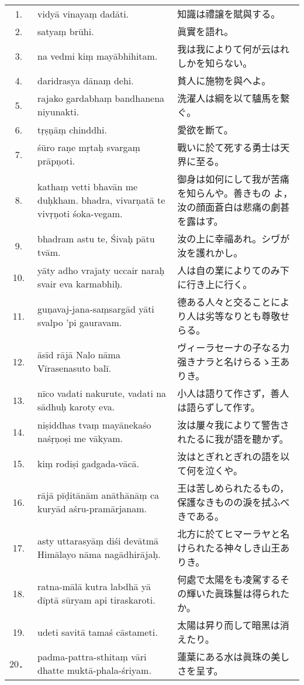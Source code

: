 \begin{longtable}{c*{2}{p{0.45\hsize}}}
 1. & vidyā vinayaṃ dadāti. & 知識は禮譲を賦與する。 \\
 2. & satyaṃ brūhi. & 眞實を語れ。\\
 3. & na vedmi kiṃ mayābhihitam. & 我は我によりて何が云はれしかを知らない。\\
 4. & daridrasya dānaṃ dehi. & 貧人に施物を與へよ。\\
 5. & rajako gardabhaṃ bandhane\-na niyunakti. & 洗濯人は綱を以て驢馬を繫ぐ。\\
 6. & tṛṣṇāṃ chinddhi. & 愛欲を斷て。\\
 7. & śūro raṇe mṛtaḥ svargaṃ prāpṇoti. & 戰いに於て死する勇士は天界に至る。\\
 8. & kathaṃ vetti bhavān me duḥkham. bhadra, vivarṇatā te
 vivṛṇoti śoka-vegam. & 御身は如何にして我が苦痛を知らんや。善きもの
 よ，汝の顔面蒼白は悲痛の劇甚を露はす。\\
 9. & bhadram astu te, Śivaḥ pātu tvām. & 汝の上に幸福あれ。シヷが汝を護れかし。\\
10. & yāty adho vrajaty uccair naraḥ svair eva karmabhiḥ. & 人は自の業によりてのみ下
 に行き上に行く。\\
11. & guṇavaj-jana-saṃsargād yāti svalpo 'pi gauravam. & 德ある人々と交ることによ
 り人は劣等なりとも尊敬せらる。\\
12. & āsīd rājā Nalo nāma Vīrasena\-suto balī. & ヴィーラセーナの子なる力
 强きナラと名けらるゝ王ありき。\\
13. & nīco vadati nakurute, vadati na sādhuḥ karoty eva. & 小人は語りて作さず，善人
 は語らずして作す。\\
14. & niṣiddhas tvaṃ mayānekaśo naśṛṇoṣi me vākyam. & 汝は屢々我によりて警吿さ
 れたるに我が語を聽かず。\\
15. & kiṃ rodiṣi gadgada-vācā. & 汝はとぎれとぎれの語を以て何を泣くや。\\
16. & rājā pīḍitānām anāthānāṃ ca kuryād aśru-pramārjanam. & 王は苦しめられたるもの，
 保護なきものの淚を拭ふべきである。\\
17. & asty uttarasyāṃ diśi devātmā Himālayo nāma nagādhirājaḥ. & 北方に於てヒマーラヤと名
 けられたる神々しき山王ありき。\\
18. & ratna-mālā kutra labdhā yā dīptā sūryam api tiraskaroti.& 何處で太陽をも凌駕するそ
 の輝いた眞珠鬘は得られたか。\\
19. & udeti savitā tamaś cāstameti. & 太陽は昇り而して暗黑は消えたり。\\
20．& padma-pattra-sthitaṃ vāri dhatte muktā-phala-śriyam. & 蓮葉にある水は眞珠の美しさを呈す。\\

\end{longtable}
